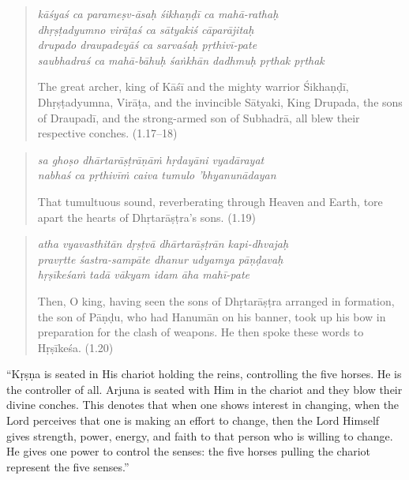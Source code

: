 \documentclass[12pt, twoside, openright]{memoir}
\begin{document}
\par
\begin{verse}
\textit{kāśyaś ca parameṣv-āsaḥ śikhaṇḍī ca mahā-rathaḥ} \\
\textit{dhṛṣṭadyumno virāṭaś ca sātyakiś cāparājitaḥ} \\
\textit{drupado draupadeyāś ca sarvaśaḥ pṛthivī-pate} \\
\textit{saubhadraś ca mahā-bāhuḥ śaṅkhān dadhmuḥ pṛthak pṛthak}

\noindent The great archer, king of Kāśī and the mighty warrior Śikhaṇḍī, Dhṛṣṭadyumna, Virāṭa, and the invincible Sātyaki, King Drupada, the sons of Draupadī, and the strong-armed son of Subhadrā, all blew their respective conches. (1.17–18)
\end{verse}
\par



\par
\begin{verse}
\textit{sa ghoṣo dhārtarāṣṭrāṇāṁ hṛdayāni vyadārayat} \\
\textit{nabhaś ca pṛthivīṁ caiva tumulo ’bhyanunādayan}

\noindent That tumultuous sound, reverberating through Heaven and Earth, tore apart the hearts of Dhṛtarāṣṭra’s sons. (1.19)
\end{verse}
\par



\par
\begin{verse}
\textit{atha vyavasthitān dṛṣṭvā dhārtarāṣṭrān kapi-dhvajaḥ} \\
\textit{pravṛtte śastra-sampāte dhanur udyamya pāṇḍavaḥ} \\
\textit{hṛṣīkeśaṁ tadā vākyam idam āha mahī-pate}

\noindent Then, O king, having seen the sons of Dhṛtarāṣṭra arranged in formation, the son of Pāṇḍu, who had Hanumān on his banner, took up his bow in preparation for the clash of weapons. He then spoke these words to Hṛṣīkeśa. (1.20)
\end{verse}
\par



\enquote{Kṛṣṇa is seated in His chariot holding the reins, controlling the five horses. He is the controller of all. Arjuna is seated with Him in the chariot and they blow their divine conches. This denotes that when one shows interest in changing, when the Lord perceives that one is making an effort to change, then the Lord Himself gives strength, power, energy, and faith to that person who is willing to change. He gives one power to control the senses: the five horses pulling the chariot represent the five senses.}
\end{document}
